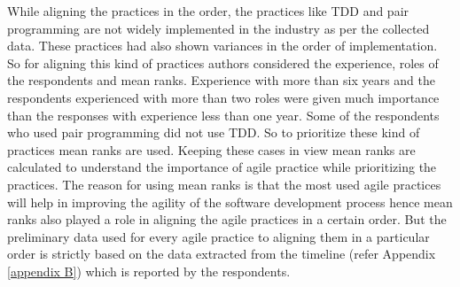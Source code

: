 \documentclass[a4paper,oneside]{bth}
\begin{document}
While aligning the practices in the order, the practices like TDD and pair programming are not widely implemented in the industry as per the collected data. These practices had also shown variances in the order of implementation. So for aligning this kind of practices authors considered the experience, roles of the respondents and mean ranks. Experience with more than six years and the respondents experienced with more than two roles were given much importance than the responses with experience less than one year. Some of the respondents who used pair programming did not use TDD. So to prioritize these kind of practices mean ranks are used. Keeping these cases in view mean ranks are calculated to understand the importance of agile practice while prioritizing the practices.  The reason for using mean ranks is that the most used agile practices will help in improving the agility of the software development process hence mean ranks also played a role in aligning the agile practices in a certain order. But the preliminary data used for every agile practice to aligning them in a particular order is strictly based on the data extracted from the timeline (refer Appendix \ref{appendix B}) which is reported by the respondents. 
\end{document}
